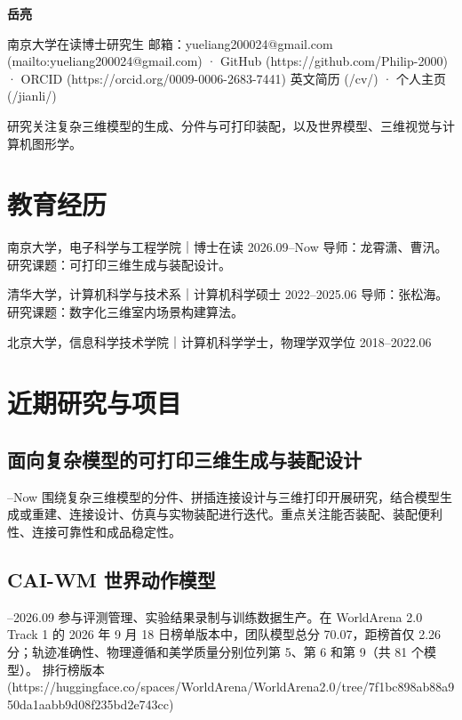\documentclass[a4paper,10pt]{ctexart}
\begin{document}
{\LARGE\bfseries 岳亮}\par
\par\smallskip
南京大学在读博士研究生
邮箱：yueliang200024@gmail.com (mailto:yueliang200024@gmail.com) · GitHub (https://github.com/Philip-2000) · ORCID (https://orcid.org/0009-0006-2683-7441)
英文简历 (/cv/) · 个人主页 (/jianli/)
\par\smallskip
研究关注复杂三维模型的生成、分件与可打印装配，以及世界模型、三维视觉与计算机图形学。
\par\smallskip
\section*{教育经历}
\par\smallskip
南京大学，电子科学与工程学院｜博士在读 2026.09–Now
导师：龙霄潇、曹汛。研究课题：可打印三维生成与装配设计。
\par\smallskip
清华大学，计算机科学与技术系｜计算机科学硕士 2022–2025.06
导师：张松海。研究课题：数字化三维室内场景构建算法。
\par\smallskip
北京大学，信息科学技术学院｜计算机科学学士，物理学双学位 2018–2022.06
\par\smallskip
\section*{近期研究与项目}
\par\smallskip
\subsection*{面向复杂模型的可打印三维生成与装配设计}
\par{}–Now
围绕复杂三维模型的分件、拼插连接设计与三维打印开展研究，结合模型生成或重建、连接设计、仿真与实物装配进行迭代。重点关注能否装配、装配便利性、连接可靠性和成品稳定性。
\par\smallskip
\subsection*{CAI-WM 世界动作模型}
\par{}–2026.09
参与评测管理、实验结果录制与训练数据生产。在 WorldArena 2.0 Track 1 的 2026 年 9 月 18 日榜单版本中，团队模型总分 70.07，距榜首仅 2.26 分；轨迹准确性、物理遵循和美学质量分别位列第 5、第 6 和第 9（共 81 个模型）。
排行榜版本 (https://huggingface.co/spaces/WorldArena/WorldArena2.0/tree/7f1bc898ab88a950da1aabb9d08f235bd2e743cc)
\par\smallskip
\end{document}
